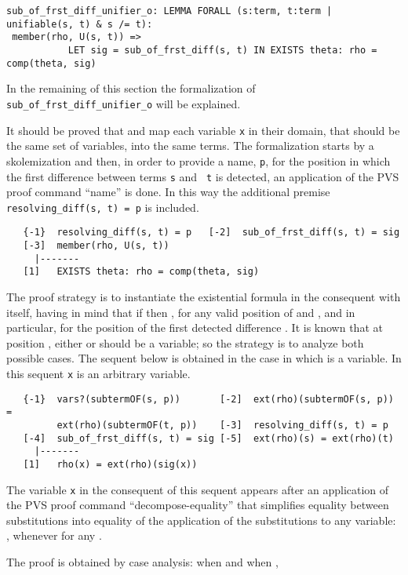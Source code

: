 \documentclass[submission,copyright,creativecommons]{eptcs}
\begin{document}
{\small
\begin{verbatim}
sub_of_frst_diff_unifier_o: LEMMA FORALL (s:term, t:term | unifiable(s, t) & s /= t):
 member(rho, U(s, t)) =>
           LET sig = sub_of_frst_diff(s, t) IN EXISTS theta: rho = comp(theta, sig)
\end{verbatim}
}

In the remaining of this section the formalization of {\tt
  sub\_of\_frst\_diff\_unifier\_o} will be explained.

It should be proved that  and  map each
variable {\tt x} in their domain, that should be the same set of
variables, into the same terms.  The formalization starts by a
skolemization and then, in order to provide a name, {\tt p}, for the
position in which the first difference between terms {\tt s} and {\tt
  t} is detected, an application of the PVS proof command ``name'' is
done. In this way the additional premise {\tt resolving\_diff(s, t) =
  p} is included.

{\small
\begin{verbatim}
   {-1}  resolving_diff(s, t) = p   [-2]  sub_of_frst_diff(s, t) = sig
   [-3]  member(rho, U(s, t))
     |-------
   [1]   EXISTS theta: rho = comp(theta, sig)
\end{verbatim}
}

The proof strategy is to instantiate the existential formula in the
consequent with  itself, having in mind that if  then , for any valid position  of 
and , and in particular, for the position of the first detected
difference . It is known that at position , either  or
 should be a variable; so the strategy is to analyze both
possible cases. The sequent below is obtained in the case in which
 is a variable. In this sequent {\tt x} is an arbitrary
variable.

{\small
\begin{verbatim}
   {-1}  vars?(subtermOF(s, p))       [-2]  ext(rho)(subtermOF(s, p)) = 
         ext(rho)(subtermOF(t, p))    [-3]  resolving_diff(s, t) = p   
   [-4]  sub_of_frst_diff(s, t) = sig [-5]  ext(rho)(s) = ext(rho)(t)
     |-------
   [1]   rho(x) = ext(rho)(sig(x))
\end{verbatim}
}

The variable {\tt x} in the consequent of this sequent appears after
an application of the PVS proof command ``decompose-equality'' that
simplifies equality between substitutions into equality of the
application of the substitutions to any variable: , whenever for any  .

The proof is obtained by case analysis: when  and when ,
\end{document}
